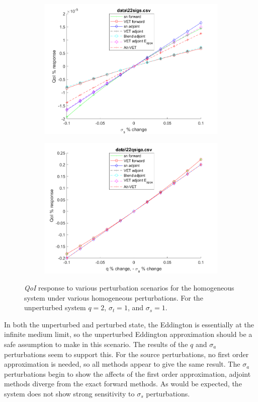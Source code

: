 \documentclass[12pt]{report}
\newcommand{\sigt}{\sigma_t}
\newcommand{\sigs}{\sigma_s}
\newcommand{\siga}{\sigma_a}
\newcommand{\qoi}{{\it QoI}\xspace}
\begin{document}
\begin{figure}[H]
\begin{subfigure}{.5\textwidth}
  \includegraphics[width=.98\linewidth]{figures2/22sigsSens.png}
  \label{T1:sfig3}
\end{subfigure}%
\begin{subfigure}{.5\textwidth}
  \centering
  \includegraphics[width=.98\linewidth]{figures2/22qsigaSens.png}
  \label{T1:sfig4}
\end{subfigure}
\caption{\qoi response to various perturbation scenarios for the homogeneous system under various homogeneous perturbations. For the unperturbed system $q=2$, $\sigt=1$, and $\sigs=1$.}
\end{figure}

In both the unperturbed and perturbed state, the Eddington is essentially at the infinite medium limit, so the unperturbed Eddington approximation should be a safe assumption to make in this scenario. The results of the $q$ and $\siga$ perturbations seem to support this. For the source perturbations, no first order approximation is needed, so all methods appear to give the same result. The $\siga$ perturbations begin to show the affects of the first order approximation, adjoint methods diverge from the exact forward methods. As would be expected, the system does not show strong sensitivity to $\sigs$ perturbations.
\end{document}
